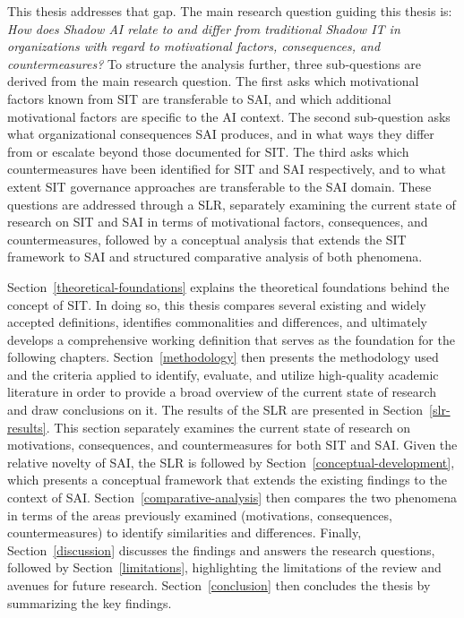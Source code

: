 \documentclass[12pt,oneside]{article}
\begin{document}
This thesis addresses that gap. The main research question guiding this thesis is: \textit{How does Shadow AI relate to and differ from traditional Shadow IT
in organizations with regard to motivational factors, consequences, and
countermeasures?} To structure the analysis further, three sub-questions are derived from the main research question. The first asks which motivational factors known from \ac{SIT} are transferable to \ac{SAI}, and which additional motivational factors are specific to the \ac{AI} context. The second sub-question asks what organizational consequences \ac{SAI} produces, and in what ways they differ from or escalate beyond those documented for \ac{SIT}. The third asks which countermeasures have been identified for \ac{SIT} and \ac{SAI} respectively, and to what extent \ac{SIT} governance approaches are transferable to the \ac{SAI} domain. These questions are addressed through a \ac{SLR}, separately examining the current state of research on \ac{SIT} and \ac{SAI} in terms of motivational factors, consequences, and countermeasures, followed by a conceptual analysis that extends the \ac{SIT} framework to \ac{SAI} and structured comparative analysis of both phenomena.

Section~\ref{theoretical-foundations} explains the theoretical foundations behind the concept of \ac{SIT}. In doing so, this thesis compares several existing and widely accepted definitions, identifies commonalities and differences, and ultimately develops a comprehensive working definition that serves as the foundation for the following chapters. Section~\ref{methodology} then presents the methodology used and the criteria applied to identify, evaluate, and utilize high-quality academic literature in order to provide a broad overview of the current state of research and draw conclusions on it. The results of the \ac{SLR} are presented in Section~\ref{slr-results}. This section separately examines the current state of research on motivations, consequences, and countermeasures for both \ac{SIT} and \ac{SAI}. Given the relative novelty of \ac{SAI}, the \ac{SLR} is followed by Section~\ref{conceptual-development}, which presents a conceptual framework that extends the existing findings to the context of \ac{SAI}. Section~\ref{comparative-analysis} then compares the two phenomena in terms of the areas previously examined (motivations, consequences, countermeasures) to identify similarities and differences. Finally, Section~\ref{discussion} discusses the findings and answers the research questions, followed by Section~\ref{limitations}, highlighting the limitations of the review and avenues for future research. Section~\ref{conclusion} then concludes the thesis by summarizing the key findings.
\end{document}
